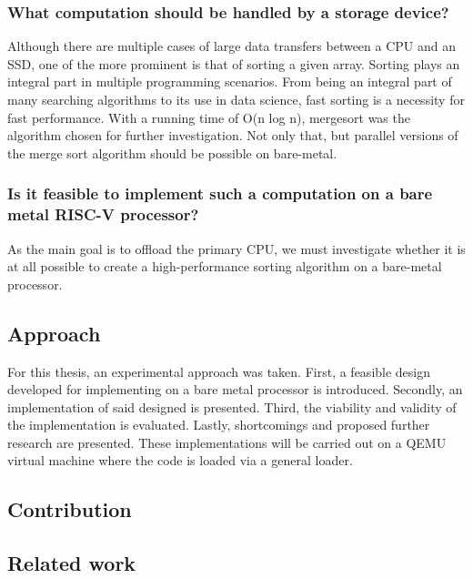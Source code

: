 \subsubsection*{What computation should be handled by a storage
device?}\label{sec:computational}
Although there are multiple cases of large data transfers between a CPU and an
SSD, one of the more prominent is that of sorting a given array. Sorting plays
an integral part in multiple programming scenarios. From being an integral part
of many searching algorithms to its use in data science, fast sorting is a
necessity for fast performance. With a running time of O(n log n), mergesort
was the algorithm chosen for further investigation. Not only that, but parallel
versions of the merge sort algorithm should be possible on bare-metal.

\subsubsection*{Is it feasible to implement such a computation on a bare metal
RISC-V processor?}
As the main goal is to offload the primary CPU, we must investigate whether it
is at all possible to create a high-performance sorting algorithm on a
bare-metal processor.

\subsection{Approach}\label{sec:approach}
For this thesis, an experimental approach was taken. First, a feasible design
developed for implementing on a bare metal processor is introduced. Secondly, an
implementation of said designed is presented. Third, the viability and validity
of the implementation is evaluated. Lastly, shortcomings and proposed further
research are presented. These implementations will be carried out on a QEMU
virtual machine where the code is loaded via a general loader.

\subsection{Contribution}



\subsection{Related work}
